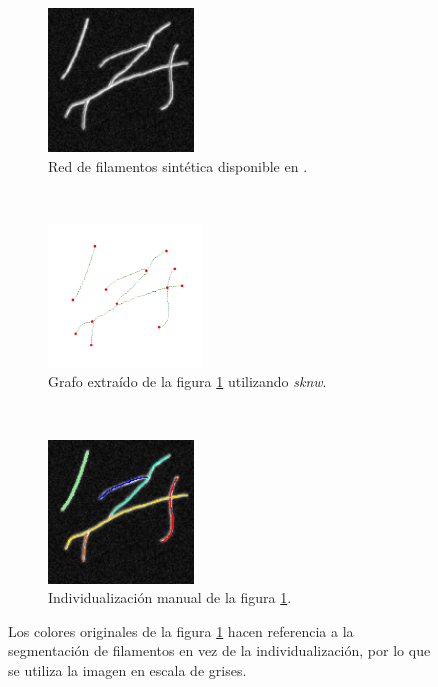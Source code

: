  \begin{figure}[h!]
    \centering
    \begin{subfigure}[t]{0.3\textwidth}
        \centering
        \includegraphics[height=1.5in]{benchImages/Synth-QuantitativeIFS-Fig7_gray.png}
        \caption{Red de filamentos sint\'etica disponible en \cite{qiu2014quantitative}. }
        \label{fig:synth-QFS-7-original}
    \end{subfigure}%
    ~ 
    \begin{subfigure}[t]{0.3\textwidth}
        \centering
        \includegraphics[height=1.5in]{benchImages/Synth-QuantitativeIFS-Fig7_graph_labeled_thick.png}
        \caption{Grafo extra\'ido de la figura \ref{fig:synth-QFS-7-original} utilizando {\it sknw}.}
        \label{fig:synth-QFS-7-graph}
    \end{subfigure}
    ~ 
    \begin{subfigure}[t]{0.3\textwidth}
        \centering
        \includegraphics[height=1.5in]{benchImages/Synth-QuantitativeIFS-Fig7_groundTruth.png}
        \caption{Individualizaci\'on manual de la figura \ref{fig:synth-QFS-7-original}.}
        \label{fig:synth-QFS-7-graph}
    \end{subfigure}
    \caption{Los colores originales de la figura \ref{fig:synth-QFS-7-original} hacen referencia a la segmentaci\'on de filamentos en vez de la individualizaci\'on, por lo que se utiliza la imagen en escala de grises.}
    \label{fig:synth-QFS-7}
\end{figure}


